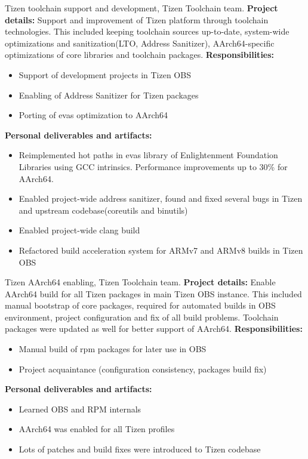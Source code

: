 \documentclass[11pt,a4paper]{moderncv}
\begin{document}
        {Tizen toolchain support and development, Tizen Toolchain team.\newline{}
          \textbf{Project details:}\newline{}
          Support and improvement of Tizen platform through toolchain technologies. This included keeping toolchain sources up-to-date, system-wide optimizations and sanitization(LTO, Address Sanitizer),
          AArch64-specific optimizations of core libraries and toolchain packages.
          \textbf{Responsibilities:}
          \begin{itemize}
          \item Support of development projects in Tizen OBS
          \item Enabling of Address Sanitizer for Tizen packages
          \item Porting of evas optimization to AArch64
          \end{itemize}
\textbf{Personal deliverables and artifacts:}
\begin{itemize}
\item Reimplemented hot paths in evas library of Enlightenment Foundation Libraries using GCC intrinsics. Performance improvements up to 30\% for AArch64.
\item Enabled project-wide address sanitizer, found and fixed several bugs in Tizen and upstream codebase(coreutils and binutils)
\item Enabled project-wide clang build
\item Refactored build acceleration system for ARMv7 and ARMv8 builds in Tizen OBS
  \end{itemize}
        }

        {Tizen AArch64 enabling, Tizen Toolchain team.\newline{}
\textbf{Project details:}\newline{}
Enable AArch64 build for all Tizen packages in main Tizen OBS instance. This included manual bootstrap of core packages, required for automated builds in OBS environment,
project configuration and fix of all build problems. Toolchain packages were updated as well for better support of AArch64.\newline{}
\textbf{Responsibilities:}
\begin{itemize}
\item Manual build of rpm packages for later use in OBS
\item Project acquaintance (configuration consistency, packages build fix)
\end{itemize}
\textbf{Personal deliverables and artifacts:}
\begin{itemize}
\item Learned OBS and RPM internals
\item AArch64 was enabled for all Tizen profiles
\item Lots of patches and build fixes were introduced to Tizen codebase
\end{itemize}}
\end{document}
